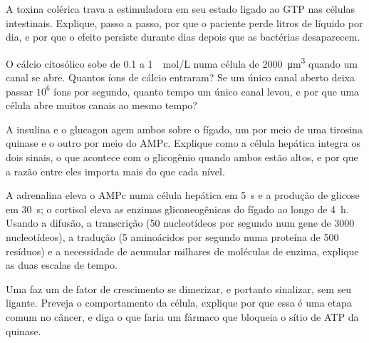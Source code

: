 \begin{exercise}[$\star\star$]\label{exo:b2:cell-signalling:7}
A toxina colérica trava a  estimuladora em seu estado ligado
ao GTP nas células intestinais. Explique, passo a passo, por que o
paciente perde litros de líquido por dia, e por que o efeito persiste
durante dias depois que as bactérias desaparecem.
\end{exercise}

\begin{exercise}[$\star\star$]\label{exo:b2:cell-signalling:8}
O cálcio citosólico sobe de \qty{0.1}{} a \qty{1}{\micro
mol/L} numa célula de \qty{2000}{\micro m^3} quando um canal se abre.
Quantos íons de cálcio entraram? Se um único canal aberto deixa passar
$10^{6}$ íons por segundo, quanto tempo um único canal levou, e por que
uma célula abre muitos canais ao mesmo tempo?
\end{exercise}

\begin{exercise}[$\star\star$]\label{exo:b2:cell-signalling:9}
A insulina e o glucagon agem ambos sobre o fígado, um por meio de uma
tirosina quinase e o outro por meio do AMPc. Explique como a célula
hepática integra os dois sinais, o que acontece com o glicogênio quando
ambos estão altos, e por que a razão entre eles importa mais do que
cada nível.
\end{exercise}

\begin{exercise}[$\star\star\star$]\label{exo:b2:cell-signalling:10}
A adrenalina eleva o AMPc numa célula hepática em \qty{5}{s} e a
produção de glicose em \qty{30}{s}; o cortisol eleva as enzimas
gliconeogênicas do fígado ao longo de \qty{4}{h}. Usando a difusão, a
transcrição (\qty{50}{} nucleotídeos por segundo num gene de
\qty{3000}{} nucleotídeos), a tradução (\qty{5}{} aminoácidos por
segundo numa proteína de \num{500} resíduos) e a necessidade de
acumular milhares de moléculas de enzima, explique as duas escalas de
tempo.
\end{exercise}

\begin{exercise}[$\star\star\star$]\label{exo:b2:cell-signalling:11}
Uma  faz um  de fator de crescimento se
dimerizar, e portanto sinalizar, sem seu ligante. Preveja o
comportamento da célula, explique por que essa é uma etapa comum no
câncer, e diga o que faria um fármaco que bloqueia o sítio de ATP da
quinase.
\end{exercise}

